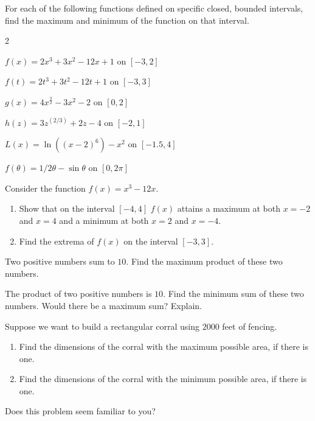 \begin{ProblemSection}
  \begin{embeddedproblem}{}
    For each of the following functions defined on specific closed,
    bounded intervals, find the maximum and minimum of the function on
    that interval.
    \begin{enumerate}[label={\bf{}(\alph*)}]
      \begin{multicols}{2}
      \item $f(x)=2x^3+3x^2-12x+1  \text{ on } [-3,2]$
      \item $f(t)=2t^3+3t^2-12t+1   \text{ on } [-3,3]$
      \item $g(x)=4x^{\frac{3}{2}}-3x^2-2  \text{ on }[0,2]$
      \item $h(z)=3z^(2/3)+2z-4  \text{ on }[-2,1]$
      \item $L(x)=\ln((x-2)^6) -x^2  \text{ on }[-1.5,4]$
      \item $f(\theta)=1/2 \theta-\sin\theta \text{  on }[0,2\pi]$
      \end{multicols}
    \end{enumerate}
  \end{embeddedproblem}

  \begin{ProficiencyDrill}
    Consider the function  $ f(x) = x^3-12x$.
    \begin{enumerate}[label={\bf{}(\alph*)}]
    \item Show that on the interval $[-4, 4]$ $f(x)$
      attains a maximum at both $x=-2$ and $x=4$ and
      a minimum at both $x=2$ and $x=-4$.
    \item Find the extrema of $f(x)$ on the interval
      $[-3,3]$.
    \end{enumerate}
  \end{ProficiencyDrill}
    
  \begin{embeddedproblem}{}
    Two positive numbers sum to $10.$  Find the maximum product of these two numbers.
  \end{embeddedproblem}

  \begin{embeddedproblem}{}
    The product of two positive numbers is $10.$  Find the minimum sum
    of these two numbers.  Would there be a maximum sum?  Explain.
  \end{embeddedproblem}


  \begin{embeddedproblem}{}
    Suppose we want to build a rectangular corral using $2000$ feet of
    fencing.
    \begin{enumerate}[label={\bf{}(\alph*)}]
    \item Find the dimensions of the corral with the maximum possible
      area, if there is one.
    \item Find the dimensions of the corral with the minimum possible
      area, if there is one.
    \end{enumerate}
    Does this problem seem familiar to you?
  \end{embeddedproblem}


\end{ProblemSection}
